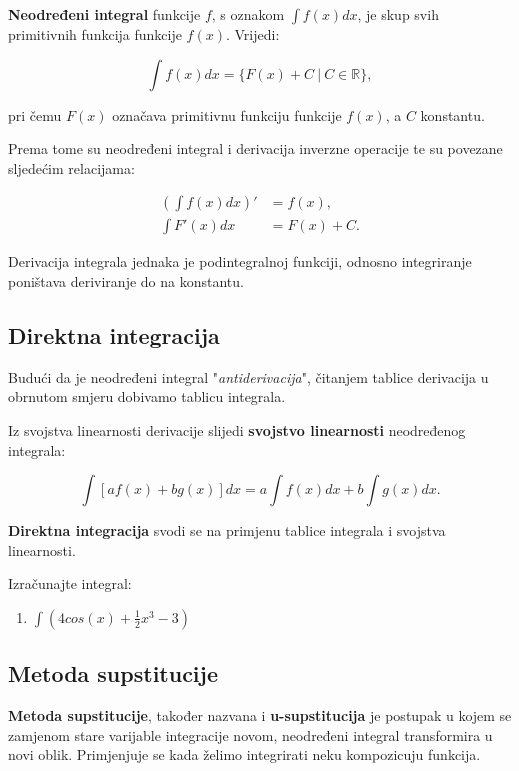 \textbf{Neodređeni integral} funkcije $f$, s oznakom $\int f(x)dx$, je skup svih
primitivnih funkcija funkcije $f(x)$. Vrijedi:

$$
\int f(x)dx = \{F(x) + C\ |\ C\in\mathbb{R}\},
$$

pri čemu $F(x)$ označava primitivnu funkciju funkcije $f(x)$, a $C$ konstantu.

Prema tome su neodređeni integral i derivacija inverzne operacije te su povezane
sljedećim relacijama:

\begin{align*}
    \left(\int f(x) dx\right)' &= f(x),\\
    \int F'(x) dx &= F(x) + C.
\end{align*}

Derivacija integrala jednaka je podintegralnoj funkciji, odnosno integriranje
poništava deriviranje do na konstantu.

\subsection{Direktna integracija}

Budući da je neodređeni integral "\textit{antiderivacija}", čitanjem tablice
derivacija u obrnutom smjeru dobivamo tablicu integrala.

Iz svojstva linearnosti derivacije slijedi \textbf{svojstvo linearnosti}
neodređenog integrala:

$$
\int \left[af(x) + bg(x)\right] dx = a \int f(x) dx + b \int g(x) dx.
$$

\textbf{Direktna integracija} svodi se na primjenu tablice integrala i svojstva
linearnosti.

\begin{example}
    Izračunajte integral:

    \begin{enumerate}
        \item $\displaystyle \int \left(4 cos(x) + \frac{1}{2} x^3 - 3\right)$
    \end{enumerate}
\end{example}

\subsection{Metoda supstitucije}

\textbf{Metoda supstitucije}, također nazvana i \textbf{u-supstitucija} je
postupak u kojem se zamjenom stare varijable integracije novom, neodređeni
integral transformira u novi oblik. Primjenjuje se kada želimo integrirati neku
kompozicuju funkcija.

